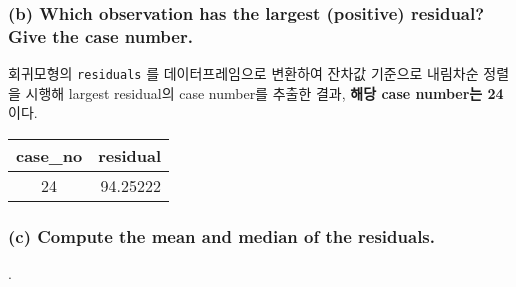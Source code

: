 \documentclass[
]{article}
\newenvironment{Shaded}{\begin{snugshade}}{\end{snugshade}}
\newcommand{\DataTypeTok}[1]{\textcolor[rgb]{0.13,0.29,0.53}{#1}}
\newcommand{\DecValTok}[1]{\textcolor[rgb]{0.00,0.00,0.81}{#1}}
\newcommand{\KeywordTok}[1]{\textcolor[rgb]{0.13,0.29,0.53}{\textbf{#1}}}
\newcommand{\NormalTok}[1]{#1}
\newcommand{\OperatorTok}[1]{\textcolor[rgb]{0.81,0.36,0.00}{\textbf{#1}}}
\newcommand{\StringTok}[1]{\textcolor[rgb]{0.31,0.60,0.02}{#1}}
\begin{document}
\hypertarget{b-which-observation-has-the-largest-positive-residual-give-the-case-number.}{%
\subsubsection{(b) Which observation has the largest (positive)
residual? Give the case
number.}\label{b-which-observation-has-the-largest-positive-residual-give-the-case-number.}}

회귀모형의 \texttt{residuals} 를 데이터프레임으로 변환하여 잔차값
기준으로 내림차순 정렬을 시행해 largest residual의 case number를 추출한
결과, \textbf{해당 case number는 24} 이다.

\begin{Shaded}
\end{Shaded}

\captionsetup[table]{labelformat=empty,skip=1pt}
\begin{longtable}{cr}
\toprule
case\_no & residual \\ 
\midrule
24 & 94.25222 \\ 
\bottomrule
\end{longtable}

\hypertarget{c-compute-the-mean-and-median-of-the-residuals.}{%
\subsubsection{(c) Compute the mean and median of the
residuals.}\label{c-compute-the-mean-and-median-of-the-residuals.}}

.

\begin{Shaded}
\end{Shaded}
\end{document}

